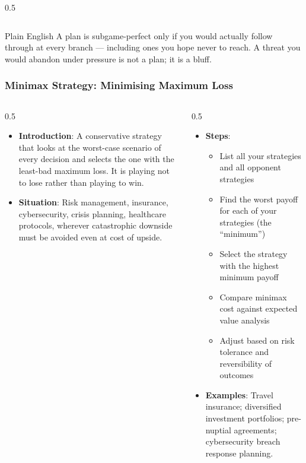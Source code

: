 \begin{frame}[fragile]
\begin{columns}
\begin{column}[T]{0.5\linewidth}
\begin{itemize}
      \end{itemize}
    \end{column}
  \end{columns}
  \vspace{4pt}
  \begin{alertblock}{Plain English}
    A plan is subgame-perfect only if you would actually follow through at every
    branch --- including ones you hope never to reach.
    A threat you would abandon under pressure is not a plan; it is a bluff.
  \end{alertblock}
\end{frame}

\begin{frame}[fragile]\frametitle{Minimax Strategy: Minimising Maximum Loss}
\begin{columns}
    \begin{column}[T]{0.5\linewidth}
      \begin{itemize}
        \item \textbf{Introduction}: A conservative strategy that looks at the worst-case scenario of every decision and selects the one with the least-bad maximum loss. It is playing not to lose rather than playing to win.
        \item \textbf{Situation}: Risk management, insurance, cybersecurity, crisis planning, healthcare protocols, wherever catastrophic downside must be avoided even at cost of upside.
      \end{itemize}
    \end{column}
    \begin{column}[T]{0.5\linewidth}
      \begin{itemize}
        \item \textbf{Steps}:
        \begin{itemize}
          \item List all your strategies and all opponent strategies
          \item Find the worst payoff for each of your strategies (the ``minimum'')
          \item Select the strategy with the highest minimum payoff
          \item Compare minimax cost against expected value analysis
          \item Adjust based on risk tolerance and reversibility of outcomes
        \end{itemize}\item \textbf{Examples}: Travel insurance; diversified investment portfolios; pre-nuptial agreements; cybersecurity breach response planning.
      \end{itemize}
    \end{column}
  \end{columns}
\end{frame}

